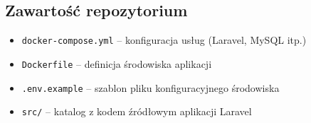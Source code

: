 \documentclass[a4paper,12pt]{article}
\begin{document}
\subsection{Zawartość repozytorium}
\begin{itemize}
  \item \texttt{docker-compose.yml} – konfiguracja usług (Laravel, MySQL itp.)
  \item \texttt{Dockerfile} – definicja środowiska aplikacji
  \item \texttt{.env.example} – szablon pliku konfiguracyjnego środowiska
  \item \texttt{src/} – katalog z kodem źródłowym aplikacji Laravel
\end{itemize}
\end{document}
